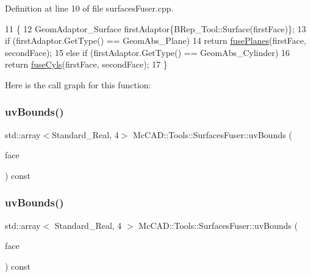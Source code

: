 Definition at line 10 of file surfaces\+Fuser.\+cpp.


\begin{DoxyCode}
11                                                                       \{
12     GeomAdaptor\_Surface firstAdaptor\{BRep\_Tool::Surface(firstFace)\};
13     \textcolor{keywordflow}{if} (firstAdaptor.GetType() == GeomAbs\_Plane)
14         \textcolor{keywordflow}{return} \hyperlink{classMcCAD_1_1Tools_1_1SurfacesFuser_a8afb3a95157d8185bccdc4ba5f372ada}{fusePlanes}(firstFace, secondFace);
15     \textcolor{keywordflow}{else} \textcolor{keywordflow}{if} (firstAdaptor.GetType() == GeomAbs\_Cylinder)
16         \textcolor{keywordflow}{return} \hyperlink{classMcCAD_1_1Tools_1_1SurfacesFuser_a803a59817fecd64ef1d8bf4a41c320ed}{fuseCyls}(firstFace, secondFace);
17 \}
\end{DoxyCode}
Here is the call graph for this function\+:
\mbox{\label{classMcCAD_1_1Tools_1_1SurfacesFuser_ab67c77b9bf4e860c5424bc91ca73095d}} 
\subsubsection{\texorpdfstring{uv\+Bounds()}{uvBounds()}\hspace{0.1cm}{\footnotesize\ttfamily [1/2]}}
{\footnotesize\ttfamily std\+::array$<$Standard\+\_\+\+Real, 4$>$ Mc\+C\+A\+D\+::\+Tools\+::\+Surfaces\+Fuser\+::uv\+Bounds (\begin{DoxyParamCaption}\item[{const Topo\+D\+S\+\_\+\+Face \&}]{face }\end{DoxyParamCaption}) const\hspace{0.3cm}{\ttfamily [private]}}

\mbox{\label{classMcCAD_1_1Tools_1_1SurfacesFuser_a5525c22611c4982eeded8b867928e2db}} 
\subsubsection{\texorpdfstring{uv\+Bounds()}{uvBounds()}\hspace{0.1cm}{\footnotesize\ttfamily [2/2]}}
{\footnotesize\ttfamily std\+::array$<$ Standard\+\_\+\+Real, 4 $>$ Mc\+C\+A\+D\+::\+Tools\+::\+Surfaces\+Fuser\+::uv\+Bounds (\begin{DoxyParamCaption}\item[{const Topo\+D\+S\+\_\+\+Face \&}]{face }\end{DoxyParamCaption}) const\hspace{0.3cm}{\ttfamily [private]}}



